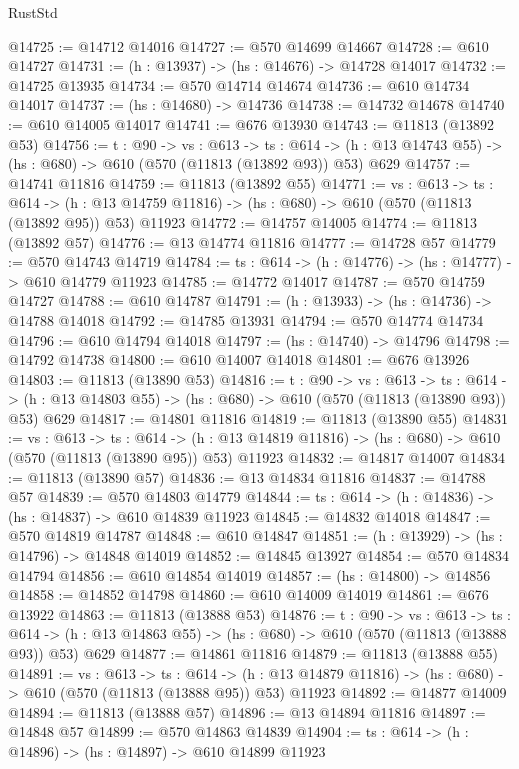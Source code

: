 \begin{lexlean}{RustStd}
\begin{coremodule}
@14725 := @14712 @14016
@14727 := @570 @14699 @14667
@14728 := @610 @14727
@14731 := (h : @13937) -> (hs : @14676) -> @14728 @14017
@14732 := @14725 @13935
@14734 := @570 @14714 @14674
@14736 := @610 @14734 @14017
@14737 := (hs : @14680) -> @14736
@14738 := @14732 @14678
@14740 := @610 @14005 @14017
@14741 := @676 @13930
@14743 := @11813 (@13892 @53)
@14756 := {t : @90} ->
  {vs : @613} ->
  {ts : @614} -> (h : @13 @14743 @55) -> (hs : @680) -> @610 (@570 (@11813 (@13892 @93)) @53) @629
@14757 := @14741 @11816
@14759 := @11813 (@13892 @55)
@14771 := {vs : @613} ->
  {ts : @614} ->
  (h : @13 @14759 @11816) -> (hs : @680) -> @610 (@570 (@11813 (@13892 @95)) @53) @11923
@14772 := @14757 @14005
@14774 := @11813 (@13892 @57)
@14776 := @13 @14774 @11816
@14777 := @14728 @57
@14779 := @570 @14743 @14719
@14784 := {ts : @614} -> (h : @14776) -> (hs : @14777) -> @610 @14779 @11923
@14785 := @14772 @14017
@14787 := @570 @14759 @14727
@14788 := @610 @14787
@14791 := (h : @13933) -> (hs : @14736) -> @14788 @14018
@14792 := @14785 @13931
@14794 := @570 @14774 @14734
@14796 := @610 @14794 @14018
@14797 := (hs : @14740) -> @14796
@14798 := @14792 @14738
@14800 := @610 @14007 @14018
@14801 := @676 @13926
@14803 := @11813 (@13890 @53)
@14816 := {t : @90} ->
  {vs : @613} ->
  {ts : @614} -> (h : @13 @14803 @55) -> (hs : @680) -> @610 (@570 (@11813 (@13890 @93)) @53) @629
@14817 := @14801 @11816
@14819 := @11813 (@13890 @55)
@14831 := {vs : @613} ->
  {ts : @614} ->
  (h : @13 @14819 @11816) -> (hs : @680) -> @610 (@570 (@11813 (@13890 @95)) @53) @11923
@14832 := @14817 @14007
@14834 := @11813 (@13890 @57)
@14836 := @13 @14834 @11816
@14837 := @14788 @57
@14839 := @570 @14803 @14779
@14844 := {ts : @614} -> (h : @14836) -> (hs : @14837) -> @610 @14839 @11923
@14845 := @14832 @14018
@14847 := @570 @14819 @14787
@14848 := @610 @14847
@14851 := (h : @13929) -> (hs : @14796) -> @14848 @14019
@14852 := @14845 @13927
@14854 := @570 @14834 @14794
@14856 := @610 @14854 @14019
@14857 := (hs : @14800) -> @14856
@14858 := @14852 @14798
@14860 := @610 @14009 @14019
@14861 := @676 @13922
@14863 := @11813 (@13888 @53)
@14876 := {t : @90} ->
  {vs : @613} ->
  {ts : @614} -> (h : @13 @14863 @55) -> (hs : @680) -> @610 (@570 (@11813 (@13888 @93)) @53) @629
@14877 := @14861 @11816
@14879 := @11813 (@13888 @55)
@14891 := {vs : @613} ->
  {ts : @614} ->
  (h : @13 @14879 @11816) -> (hs : @680) -> @610 (@570 (@11813 (@13888 @95)) @53) @11923
@14892 := @14877 @14009
@14894 := @11813 (@13888 @57)
@14896 := @13 @14894 @11816
@14897 := @14848 @57
@14899 := @570 @14863 @14839
@14904 := {ts : @614} -> (h : @14896) -> (hs : @14897) -> @610 @14899 @11923

\end{coremodule}
\end{lexlean}
